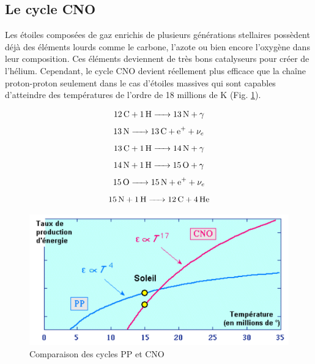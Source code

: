\subsection{Le cycle CNO}\label{2.1.2}

Les étoiles composées de gaz enrichis de plusieurs générations stellaires possèdent déjà des éléments lourds comme le carbone, l’azote ou bien encore l’oxygène dans leur composition. Ces éléments deviennent de très bons catalyseurs pour créer de l’hélium. Cependant, le cycle CNO devient réellement plus efficace que la chaîne proton-proton seulement dans le cas d'étoiles massives qui sont capables d'atteindre des températures de l'ordre de 18 millions de K (Fig. \ref{Fig. 2.1}). 


\begin{equation}\ce{\ce{12C} + \ce{1H} -> \ce{13N} +$\gamma$}\label{Eq. 2.4}\end{equation}				     	
\begin{equation}\ce{\ce{13N} -> \ce{13C} + \ce{e+} + $\nu_{e}$ }\label{Eq. 2.5}\end{equation}					   	
\begin{equation}\ce{\ce{13C} + \ce{1H} -> \ce{14N} + $\gamma$ }\label{Eq. 2.6}\end{equation}	
\begin{equation}\ce{\ce{14N} + \ce{1H} -> \ce{15O} + $\gamma$}\label{Eq. 2.7}\end{equation}\newpage\vspace{2cm}		
\begin{equation}\ce{\ce{15O} -> \ce{15N} + \ce{e+} + $\nu_{e}$	}\label{Eq. 2.8}\end{equation}
\begin{equation}\ce{\ce{15N} + \ce{1H} -> \ce{12C} + \ce{4He}}\label{Eq. 2.9}\end{equation}\smallskip

\begin{figure}[H]
	\centering
	\includegraphics[scale=0.7]{images/cno-pp}
	\caption[Comparaison des cycles PP et CNO]{Comparaison des cycles PP et CNO}
	\label{Fig. 2.1}
\end{figure}\bigskip

